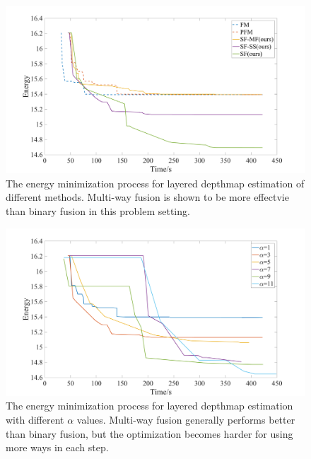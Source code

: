 
\begin{figure}[tb]
  \includegraphics[width=\columnwidth]{figure/layered_depthmap_convergence.png}
  \caption{The energy minimization process for layered depthmap estimation of different methods. Multi-way fusion is shown to be more effectvie than binary fusion in this problem setting.}\label{fig:layered_depthmap_convergence}
\end{figure}
\begin{figure}[tb]
  \includegraphics[width=\columnwidth]{figure/layered_depthmap_by_alpha.png}
  \caption{The energy minimization process for layered depthmap estimation with different $\alpha$ values. Multi-way fusion generally performs better than binary fusion, but the optimization becomes harder for using more ways in each step.}\label{fig:layered_depthmap_by_alpha}
\end{figure}

